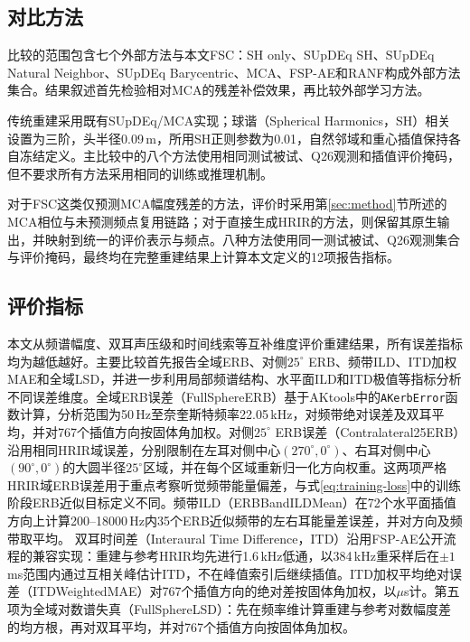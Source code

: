 \documentclass[UTF8,a4paper]{article}
\begin{document}
\subsection{对比方法}
比较的范围包含七个外部方法与本文FSC：SH only、SUpDEq SH、SUpDEq Natural Neighbor、SUpDEq Barycentric、MCA、FSP-AE和RANF构成外部方法集合。结果叙述首先检验相对MCA的残差补偿效果，再比较外部学习方法。

传统重建采用既有SUpDEq/MCA实现；球谐（Spherical Harmonics，SH）相关设置为三阶，头半径0.09\,m，所用SH正则参数为0.01，自然邻域和重心插值保持各自冻结定义。主比较中的八个方法使用相同测试被试、Q26观测和插值评价掩码，但不要求所有方法采用相同的训练或推理机制。

对于FSC这类仅预测MCA幅度残差的方法，评价时采用第\ref{sec:method}节所述的MCA相位与未预测频点复用链路；对于直接生成HRIR的方法，则保留其原生输出，并映射到统一的评价表示与频点。八种方法使用同一测试被试、Q26观测集合与评价掩码，最终均在完整重建结果上计算本文定义的12项报告指标。

\subsection{评价指标}
本文从频谱幅度、双耳声压级和时间线索等互补维度评价重建结果，所有误差指标均为越低越好。主要比较首先报告全域ERB、对侧$25^\circ$ ERB、频带ILD、ITD加权MAE和全域LSD，并进一步利用局部频谱结构、水平面ILD和ITD极值等指标分析不同误差维度。全域ERB误差（FullSphereERB）基于AKtools中的\texttt{AKerbError}函数\cite{R12}计算，分析范围为50\,Hz至奈奎斯特频率22.05\,kHz，对频带绝对误差及双耳平均，并对767个插值方向按固体角加权。对侧$25^\circ$ ERB误差（Contralateral25ERB）沿用相同HRIR域误差，分别限制在左耳对侧中心$(270^\circ,0^\circ)$、右耳对侧中心$(90^\circ,0^\circ)$的大圆半径$25^\circ$区域，并在每个区域重新归一化方向权重。这两项严格HRIR域ERB误差用于重点考察听觉频带能量偏差，与式\eqref{eq:training-loss}中的训练阶段ERB近似目标定义不同。频带ILD（ERBBandILDMean）在72个水平面插值方向上计算200--18000\,Hz内35个ERB近似频带的左右耳能量差误差，并对方向及频带取平均。
双耳时间差（Interaural Time Difference，ITD）沿用FSP-AE公开流程的兼容实现\cite{R4}：重建与参考HRIR均先进行1.6\,kHz低通，以384\,kHz重采样后在$\pm1$\,ms范围内通过互相关峰估计ITD，不在峰值索引后继续插值。ITD加权平均绝对误差（ITDWeightedMAE）对767个插值方向的绝对差按固体角加权，以$\mu$s计。第五项为全域对数谱失真（FullSphereLSD）：先在频率维计算重建与参考对数幅度差的均方根，再对双耳平均，并对767个插值方向按固体角加权。
\end{document}
